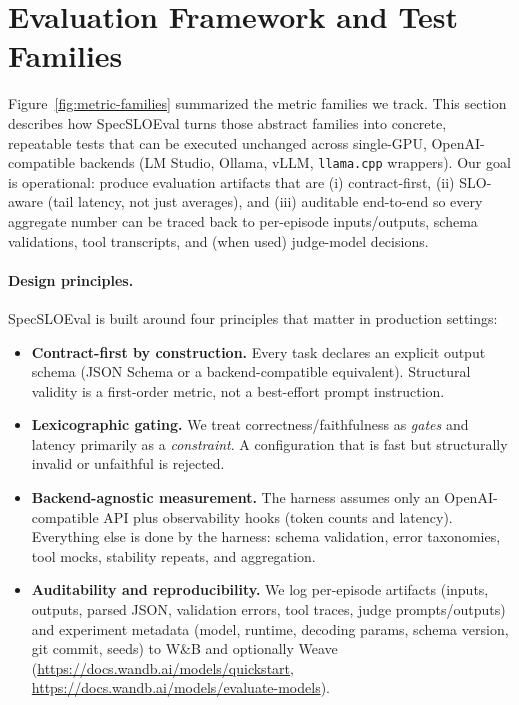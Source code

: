 \documentclass[11pt]{article}
\begin{document}
\section{Evaluation Framework and Test Families}
\label{sec:eval-framework}

Figure~\ref{fig:metric-families} summarized the metric families we track.
This section describes how SpecSLOEval turns those abstract families into concrete, repeatable tests that can be executed unchanged across single-GPU, OpenAI-compatible backends (LM Studio, Ollama, vLLM, \texttt{llama.cpp} wrappers).
Our goal is operational: produce evaluation artifacts that are (i) contract-first, (ii) SLO-aware (tail latency, not just averages), and (iii) auditable end-to-end so every aggregate number can be traced back to per-episode inputs/outputs, schema validations, tool transcripts, and (when used) judge-model decisions.

\paragraph{Design principles.}
SpecSLOEval is built around four principles that matter in production settings:

\begin{itemize}[leftmargin=12pt]
    \item \textbf{Contract-first by construction.} Every task declares an explicit output schema (JSON Schema or a backend-compatible equivalent). Structural validity is a first-order metric, not a best-effort prompt instruction.
    \item \textbf{Lexicographic gating.} We treat correctness/faithfulness as \emph{gates} and latency primarily as a \emph{constraint}. A configuration that is fast but structurally invalid or unfaithful is rejected.
    \item \textbf{Backend-agnostic measurement.} The harness assumes only an OpenAI-compatible API plus observability hooks (token counts and latency). Everything else is done by the harness: schema validation, error taxonomies, tool mocks, stability repeats, and aggregation.
    \item \textbf{Auditability and reproducibility.} We log per-episode artifacts (inputs, outputs, parsed JSON, validation errors, tool traces, judge prompts/outputs) and experiment metadata (model, runtime, decoding params, schema version, git commit, seeds) to W\&B and optionally Weave (\url{https://docs.wandb.ai/models/quickstart}, \url{https://docs.wandb.ai/models/evaluate-models}).
\end{itemize}
\end{document}
